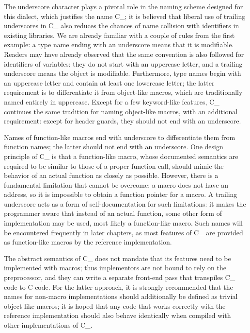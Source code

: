 The underscore character plays a pivotal role in the naming
scheme designed for this dialect, which justifies the name C\_;
it is believed that liberal use of trailing underscores in C\_ also reduces
the chances of name collision with identifiers in existing libraries.
We are already familiar with a couple of rules from the first example:
a type name ending with an underscore means that it is modifiable.
Readers may have already observed that the same
convention is also followed for identifiers of variables:
they do not start with an uppercase letter,
and a trailing underscore means the object is modifiable.
Furthermore, type names begin with an uppercase
letter and contain at least one lowercase letter;
the latter requirement is to differentiate it from object-like macros,
which are traditionally named entirely in uppercase.
Except for a few keyword-like features, C\_ continues the same
tradition for naming object-like macros, with an additional requirement:
except for header guards, they should not end with an underscore.

Names of function-like macros end with underscore to differentiate
them from function names; the latter should not end with an underscore.
One design principle of C\_ is that a function-like macro, whose documented
semantics are required to be similar to those of a proper function call,
should mimic the behavior of an actual function as closely as possible.
However, there is a fundamental limitation that cannot be overcome:
a macro does not have an address,
so it is impossible to obtain a function pointer for a macro.
A trailing underscore acts as a form of self-documentation for such limitations:
it makes the programmer aware that instead of an actual function, some other
form of implementation may be used, most likely a function-like macro.
Such names will be encountered frequently in later chapters, as most features
of C\_ are provided as function-like macros by the reference implementation.

The abstract semantics of C\_ does not mandate that
its features need to be implemented with macros;
thus implementors are not bound to rely on the preprocessor,
and they can write a separate front-end pass that transpiles C\_ code to C code.
For the latter approach, it is strongly recommended that the names for non-macro
implementations should additionally be defined as trivial object-like macros;
it is hoped that any code that works correctly with the reference implementation
should also behave identically when compiled with other implementations of C\_.

